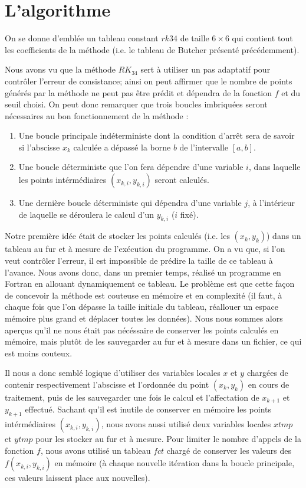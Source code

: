 \documentclass[a4paper, titlepage]{livret} %
\begin{document}
		\section{L'algorithme}
			On se donne d'emblée un tableau constant $rk34$ de taille $6\times6$ qui contient tout les coefficients de la méthode (i.e. le tableau de Butcher présenté précédemment).

			Nous avons vu que la méthode $RK_{34}$ sert à utiliser un pas adaptatif pour contrôler l'erreur de consistance; ainsi on peut affirmer que le nombre de points générés par la méthode ne peut pas être \og prédit \fg{} et dépendra de la fonction $f$ et du seuil choisi.
			On peut donc remarquer que trois boucles imbriquées seront nécessaires au bon fonctionnement de la méthode :
			\begin{enumerate}
				\item Une boucle principale indéterministe dont la condition d'arrêt sera de savoir si l'abscisse $x_{k}$ calculée a dépassé la borne $b$ de l'intervalle $[a,b]$.
				\item Une boucle déterministe que l'on fera dépendre d'une variable $i$, dans laquelle les points intérmédiaires $(x_{k,i},y_{k,i})$ seront calculés.
				\item Une dernière boucle déterministe qui dépendra d'une variable $j$, à l'intérieur de laquelle se déroulera le calcul d'un $y_{k,i}$ ($i$ fixé).
			\end{enumerate}

			Notre première idée était de stocker les points calculés (i.e. les $(x_{k},y_{k})$) dans un tableau au fur et à mesure de l'exécution du programme.
			On a vu que, si l'on veut contrôler l'erreur, il est impossible de \og prédire \fg{} la taille de ce tableau à l'avance.
			Nous avons donc, dans un premier temps, réalisé un programme en Fortran en allouant dynamiquement ce tableau.
			Le problème est que cette façon de concevoir la méthode est couteuse en mémoire et en complexité (il faut, à chaque fois que l'on dépasse la taille initiale du tableau, réallouer un espace mémoire plus grand et déplacer toutes les données).
			Nous nous sommes alors aperçus qu'il ne nous était pas nécéssaire de conserver les points calculés en mémoire, mais plutôt de les sauvegarder au fur et à mesure dans un fichier, ce qui est moins couteux.

			Il nous a donc semblé logique d'utiliser des variables locales $x$ et $y$ chargées de contenir respectivement l'abscisse et l'ordonnée du point $(x_{k},y_{k})$ en cours de traitement, puis de les sauvegarder une fois le calcul et l'affectation de $x_{k+1}$ et $y_{k+1}$ effectué.
			Sachant qu'il est inutile de conserver en mémoire les points intérmédiaires $(x_{k,i},y_{k,i})$, nous avons aussi utilisé deux variables locales $xtmp$ et $ytmp$ pour les stocker au fur et à mesure.
			Pour limiter le nombre d'appels de la fonction $f$, nous avons utilisé un tableau $fct$ chargé de conserver les valeurs des $f(x_{k,i}, y_{k,i})$ en mémoire (à chaque nouvelle itération dans la boucle principale, ces valeurs laissent place aux nouvelles).
\end{document}
